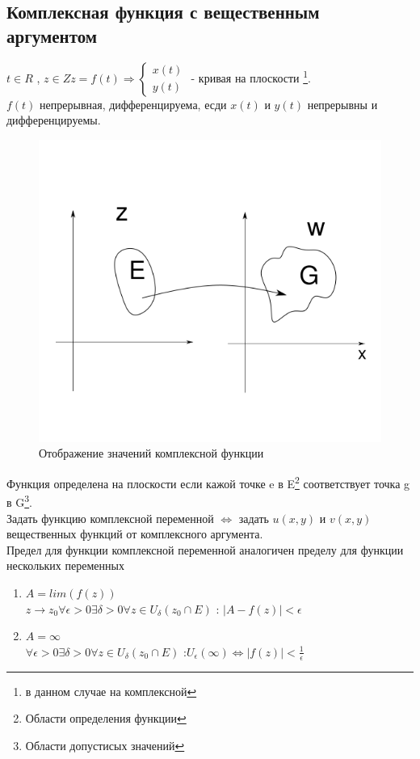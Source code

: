 \documentclass{article}
\begin{document}
           \subsection{Комплексная функция с вещественным аргументом}
             $ t \in R $ , $z \in Z z=f(t) \Rightarrow \begin{cases} x(t)\\y(t) \end{cases} $ - кривая на плоскости \footnote{в данном случае на комплексной}.\\
             $f(t)$ непрерывная, дифференцируема, есди $x(t)$ и $y(t)$ непрерывны и дифференцируемы.\\
             \begin{figure}[H]
                  \includegraphics[width=0.6\linewidth]{complex_imagine_example}
                  \caption{Отображение значений комплексной функции}
                  \label{ris:complex_imagine_example}
              \end{figure}
         Функция определена на плоскости если кажой точке e в E\footnote{Области определения функции} соответствует точка g в G\footnote{ Области допустисых значений}.\\ Задать функцию комплексной переменной $\Leftrightarrow$ задать $u(x,y)$ и $v(x,y)$ вещественных функций от комплексного аргумента.\\
         Предел для функции комплексной переменной аналогичен пределу для функции нескольких переменных
           \begin{enumerate}
             \item $A=lim(f(z))$\\
             $z \rightarrow z_{0} \forall \epsilon>0 \exists \delta>0 \forall z \in U _{ \delta }(z_{0} \cap E)$ : $|A-f(z)|< \epsilon$
             \item $A=\infty$ \\
             $\forall \epsilon>0 \exists \delta>0 \forall z \in U _{ \delta }(z_{0} \cap E)$ :$ U_{\epsilon}(\infty) \Leftrightarrow |f(z)|< \frac{1}{\epsilon}$
           \end{enumerate}
\end{document}
